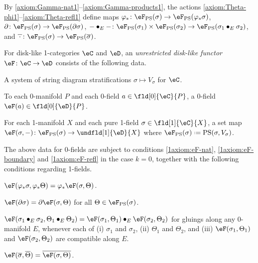 \documentclass[12pt,reqno]{amsart}
\newcommand{\C}{\eC}
\newcommand{\D}{\eD}
\newcommand{\blt}{\bullet}
\newcommand{\fcj}[1]{\overline{#1}}
\newcommand{\orev}{\overline}
\newcommand{\defn}[1]{\emph{#1}}
\DeclareRobustCommand{\coloneq}{\mathrel{\vcenter{\baselineskip0.5ex\lineskiplimit0pt\hbox{\scriptsize{\upshape.}}\hbox{\scriptsize{\upshape.}}}}=}
\begin{document}
By \ref{axiom:Gamma-nat1}--\ref{axiom:Gamma-products1}, the actions \ref{axiom:Theta-phi1}--\ref{axiom:Theta-refl1} define maps $\varphi_*\colon\eF_{\mathrm{PS}}(\sigma)\to\eF_{\mathrm{PS}}(\varphi_*\sigma)$, $\partial\colon\eF_{\mathrm{PS}}(\sigma)\to\eF_{\mathrm{PS}}(\partial\sigma)$, 
$-\blt_E-\colon\eF_{\mathrm{PS}}(\sigma_1)\times\eF_{\mathrm{PS}}(\sigma_2)\to\eF_{\mathrm{PS}}(\sigma_1\blt_E\sigma_2)$, and $\orev{\,\cdot\,}\colon\eF_{\mathrm{PS}}(\sigma)\to\eF_{\mathrm{PS}}(\fcj\sigma)$.
\begin{definition}
\label{def:1unrestricted-functor}
For disk-like 1-categories $\C$ and $\D$, an \defn{unrestricted disk-like functor} $\eF\colon\C\to\D$ consists of the following data.
\begin{lst}
  \item[(D$\eF\Theta\Gamma$)]\label{1axiom:FGamma-data}
  A system of string diagram stratifications $\sigma\mapsto V_\sigma$ for $\C$.
  \item[(1$\eF\Theta_0$)]
  To each 0-manifold $P$ and each 0-field $a\in\fld[0]{\C}{P}$, a 0-field $\eF(a)\in\fld[0]{\D}{P}$.
  \item[(1$\eF\Theta_1$)] 
  For each 1-manifold $X$ and each pure 1-field $\sigma\in\fld[1]{\C}{X}$, a set map $\eF(\sigma,-)\colon\eF_{\mathrm{PS}}(\sigma)\to\undfld[1]{\D}{X}$ where $\eF_{\mathrm{PS}}(\sigma)\coloneq\mathrm{PS}(\sigma,V_\sigma)$.
\end{lst}
The above data for 0-fields are subject to conditions \ref{1axiom:eF-nat}, \ref{1axiom:eF-boundary} and \ref{1axiom:eF-refl} in the case $k=0$, together with the following conditions regarding 1-fields.
\begin{lst}
  \item[(F$\Theta\varphi$)]\label{1axiom:FTheta-nat} $\eF(\varphi_*\sigma,\varphi_*\Theta)=\varphi_*\eF(\sigma,\Theta)$.
  \item[(F$\Theta\partial$)]\label{1axiom:FTheta-bdy} $\eF(\partial\sigma)=\partial\eF(\sigma,\Theta)$ for all $\Theta\in\eF_{\mathrm{PS}}(\sigma)$.
  \item[(F$\Theta$G)]\label{1axiom:FTheta-gluing} $\eF(\sigma_1\blt_E\sigma_2,\Theta_1\blt_E\Theta_2)=\eF(\sigma_1,\Theta_1)\blt_E\eF(\sigma_2,\Theta_2)$ for gluings along any 0-manifold $E$, whenever each of (i) $\sigma_1$ and $\sigma_2$, (ii) $\Theta_1$ and $\Theta_2$, and (iii) $\eF(\sigma_1,\Theta_1)$ and $\eF(\sigma_2,\Theta_2)$ are compatible along $E$.
  \item[(F$\Theta\orev{\,\cdot\,}$)]\label{1axiom:FTheta-refl} $\eF(\fcj\sigma,\orev\Theta)=\fcj{\eF(\sigma,\Theta)}$.

\end{lst}
\end{definition}
\end{document}
